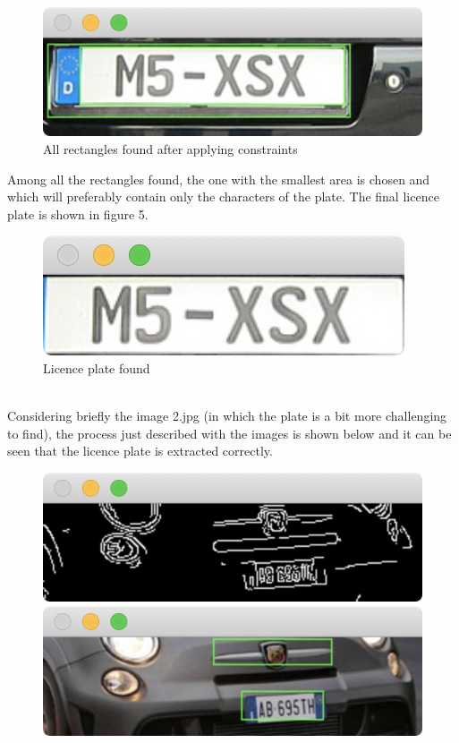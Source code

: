 \documentclass[11pt]{article}
\begin{document}
\begin{titlepage}
{\begin{figure}[htbp]
\centering
\includegraphics[totalheight=0.19\textwidth]{c1.jpg}
\caption{All rectangles found after applying constraints}
\label{}
\end{figure}
\newpage
\noindent	
Among all the rectangles found, the one with the smallest area is chosen and which will preferably contain only the characters of the plate. The final licence plate is shown in figure 5.
\begin{figure}[htbp]
\centering
\includegraphics[totalheight=0.13\textwidth]{t.jpg}
\caption{Licence plate found}
\label{}
\end{figure}
\\ Considering briefly the image 2.jpg (in which the plate is a bit more challenging to find), the process just described with the images is shown below and it can be seen that the licence plate is extracted correctly.
\begin{figure}[htbp]
\centering
\includegraphics[totalheight=0.132\textwidth]{c3.jpg}
\includegraphics[totalheight=0.132\textwidth]{t1.jpg}

\end{figure}}
\end{titlepage}
\end{document}
